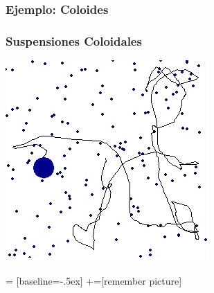 \begin{frame}
    \frametitle{Ejemplo: Coloides}
	\begin{center}
	\end{center}
 \end{frame}
\begin{frame}
    \frametitle{Suspensiones Coloidales}
	 \begin{center}
		\includegraphics{./Imagenes/Introduccion/browngranular-foto2p.png}
	 \end{center}
\end{frame}
 = [baseline=-.5ex]
+=[remember picture]
\everymath{\displaystyle}
